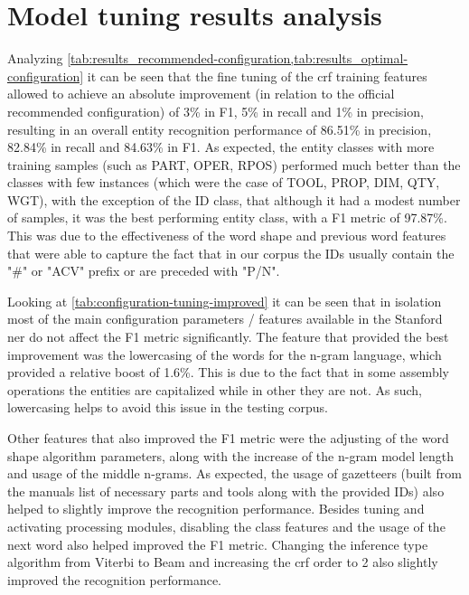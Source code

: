 \section{Model tuning results analysis}\label{sec:model-tuning-results}

Analyzing \cref{tab:results_recommended-configuration,tab:results_optimal-configuration} it can be seen that the fine tuning of the \gls{crf} training features allowed to achieve an absolute improvement (in relation to the official recommended configuration) of 3\% in F1, 5\% in recall and 1\% in precision, resulting in an overall entity recognition performance of 86.51\% in precision, 82.84\% in recall and 84.63\% in F1. As expected, the entity classes with more training samples (such as PART, OPER, RPOS) performed much better than the classes with few instances (which were the case of TOOL, PROP, DIM, QTY, WGT), with the exception of the ID class, that although it had a modest number of samples, it was the best performing entity class, with a F1 metric of 97.87\%. This was due to the effectiveness of the word shape and previous word features that were able to capture the fact that in our corpus the IDs usually contain the "\#" or "ACV" prefix or are preceded with "P/N".

Looking at \cref{tab:configuration-tuning-improved} it can be seen that in isolation most of the main configuration parameters / features available in the Stanford \gls{ner} do not affect the F1 metric significantly. The feature that provided the best improvement was the lowercasing of the words for the n-gram language, which provided a relative boost of 1.6\%. This is due to the fact that in some assembly operations the entities are capitalized while in other they are not. As such, lowercasing helps to avoid this issue in the testing corpus.

Other features that also improved the F1 metric were the adjusting of the word shape algorithm parameters, along with the increase of the n-gram model length and usage of the middle n-grams. As expected, the usage of gazetteers (built from the manuals list of necessary parts and tools along with the provided IDs) also helped to slightly improve the recognition performance. Besides tuning and activating processing modules, disabling the class features and the usage of the next word also helped improved the F1 metric. Changing the inference type algorithm from Viterbi to Beam and increasing the \gls{crf} order to 2 also slightly improved the recognition performance.

